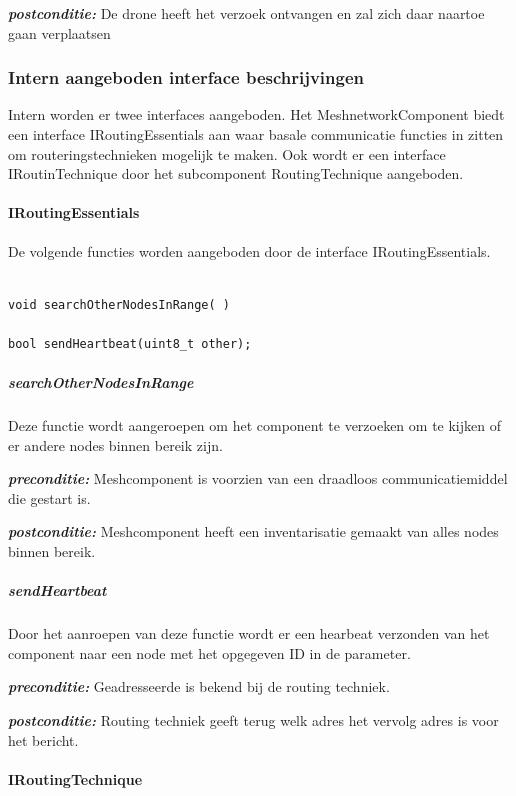 \documentclass[a4paper, 11pt, oneside]{report}
\begin{document}
\textbf{\textit{postconditie:}} De drone heeft het verzoek ontvangen en zal zich daar naartoe gaan verplaatsen

\subsubsection{Intern aangeboden interface beschrijvingen}
\label{DetailedDesign:CommunicatieComponentDiagram:interface:intern}

Intern worden er twee interfaces aangeboden. Het MeshnetworkComponent biedt een interface IRoutingEssentials aan waar basale communicatie functies in zitten om routeringstechnieken mogelijk te maken.  Ook wordt er een interface IRoutinTechnique door het subcomponent RoutingTechnique aangeboden.

\paragraph{IRoutingEssentials}

De volgende functies worden aangeboden door de interface IRoutingEssentials. 

\begin{lstlisting}

void searchOtherNodesInRange( )	

bool sendHeartbeat(uint8_t other);

\end{lstlisting}
\subparagraph{searchOtherNodesInRange}
Deze functie wordt aangeroepen om het component te verzoeken om te kijken of er andere nodes binnen bereik zijn.


\textbf{\textit{preconditie:}} Meshcomponent is voorzien van een draadloos communicatiemiddel die gestart is. 

\textbf{\textit{postconditie:}} Meshcomponent heeft een inventarisatie gemaakt van alles nodes binnen bereik. 

\subparagraph{sendHeartbeat}
Door het aanroepen van deze functie wordt er een hearbeat verzonden van het component naar een node met het opgegeven ID in de parameter.

\textbf{\textit{preconditie:}} Geadresseerde is bekend bij de routing techniek.

\textbf{\textit{postconditie:}} Routing techniek geeft terug welk adres het vervolg adres is voor het bericht.

\paragraph{IRoutingTechnique}
\end{document}
